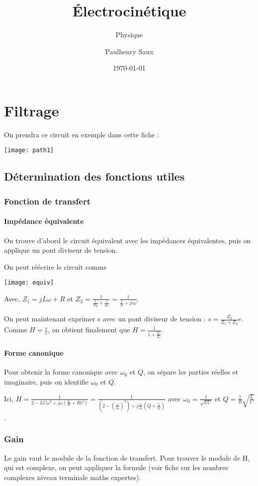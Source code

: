 \documentclass[french]{yLectureNote}
\title{Électrocinétique}
\subtitle{Physique}
\author{Paulhenry Saux}
\date{\today}
\begin{document}
\setcounter{chapter}{5}

\chapter{Filtrage}
On prendra ce circuit en exemple dans cette fiche :

\texttt{[image: path1]}
\section{Détermination des fonctions utiles}
\subsection{Fonction de transfert}
\subsubsection{Impédance équivalente}

On trouve d'abord le circuit équivalent avec les impédances équivalentes, puis on applique un pont diviseur de tension.

On peut réécrire le circuit comme

\texttt{[image: equiv]}


Avec, $Z_1 = jL\omega+R$ et $Z_2 = \frac{1}{\frac{1}{Z_R}+\frac{1}{Z_C}} = \frac{1}{\frac{1}{R} + jc\omega}$.

On peut maintenant exprimer s avec un pont diviseur de tension : $s = \frac{Z_2}{Z_1+Z_2}e$. Comme $H = \frac{s}{e}$, on obtient finalement que $H = \frac{1}{1+\frac{Z_1}{Z_2}}$.
\subsubsection{Forme canonique}
Pour obtenir la forme canonique avec $\omega_0$ et $Q$, on sépare les parties réelles et imaginaire, puis on identifie $\omega_0$ et $Q$.

Ici, $H = \frac{1}{2-LC\omega^2+j\omega(\frac{L}{R}+RC)} = \frac{1}{(2-(\frac{\omega}{\omega_0})^2)+j\frac{\omega}{\omega_0}(Q+\frac{1}{Q})}$ avec $\omega_0 = \frac{1}{\sqrt{LC}}$ et $Q = \frac{1}{R}\sqrt{\frac{L}{C}}$.
\subsection{Gain}
Le gain vaut le module de la fonction de transfert. Pour trouver le module de H, qui est complexe, on peut appliquer la formule (voir fiche sur les nombres complexes niveau terminale maths expertes).
\end{document}
